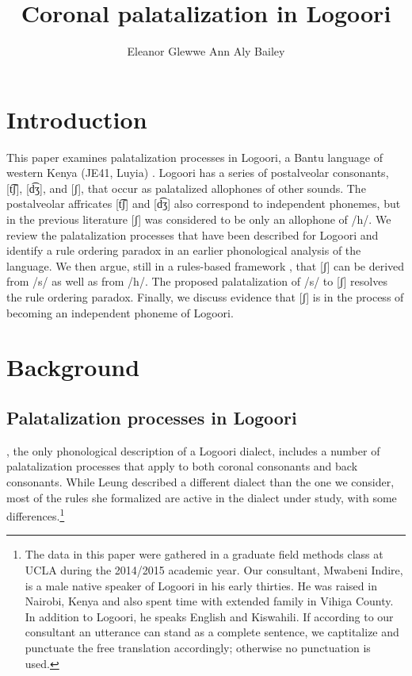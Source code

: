 \documentclass[output=paper]{langsci/langscibook}
\title{Coronal palatalization in Logoori}
\author{%
 Eleanor Glewwe\affiliation{University of California, Los Angeles}\lastand 
 Ann Aly Bailey \affiliation{University of California, Los Angeles}
}
\begin{document}
 



\section{Introduction}

This paper examines palatalization processes in Logoori, a Bantu language of western Kenya (JE41, Luyia) \citep{Mould1981,Bastin2003}. Logoori has a series of postalveolar consonants, [t͡ʃ], [d͡ʒ], and [ʃ], that occur as palatalized allophones of other sounds. The postalveolar affricates [t͡ʃ] and [d͡ʒ] also correspond to independent phonemes, but in the previous literature [ʃ] was considered to be only an allophone of /h/. We review the palatalization processes that have been described for Logoori and identify a rule ordering paradox in an earlier phonological analysis of the language. We then argue, still in a rules-based framework \citep{ChomskyHalle1968}, that [ʃ] can be derived from /s/ as well as from /h/. The proposed palatalization of /s/ to [ʃ] resolves the rule ordering paradox. Finally, we discuss evidence that [ʃ] is in the process of becoming an independent phoneme of Logoori.

\section{Background}
\subsection{Palatalization processes in Logoori} %

\citet{Leung1991}, the only phonological description of a Logoori dialect, includes a number of palatalization processes that apply to both coronal consonants and back consonants. While Leung described a different dialect than the one we consider, most of the rules she formalized are active in the dialect under study, with some differences.\footnote{The data in this paper were gathered in a graduate field methods class at UCLA during the 2014/2015 academic year. Our consultant, Mwabeni Indire, is a male native speaker of Logoori in his early thirties. He was raised in Nairobi, Kenya and also spent time with extended family in Vihiga County. In addition to Logoori, he speaks English and Kiswahili. If according to our consultant an utterance can stand as a complete sentence, we captitalize and punctuate the free translation accordingly; otherwise no punctuation is used.} 
\end{document}

